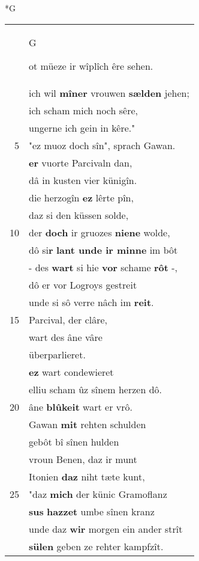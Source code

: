 \documentclass[8pt,a4paper,notitlepage]{article}
\begin{document}
\begin{table}[ht]
\begin{minipage}[t]{0.5\linewidth}
\small
\begin{center}*G
\end{center}
\begin{tabular}{rl}
 & \begin{large}G\end{large}ot müeze ir wîplîch êre sehen.\\ 
 & ich wil \textbf{mîner} vrouwen \textbf{sælden} jehen;\\ 
 & ich scham mich noch sêre,\\ 
 & ungerne ich gein in kêre."\\ 
5 & "ez muoz doch sîn", sprach Gawan.\\ 
 & \textbf{er} vuorte Parcivaln dan,\\ 
 & dâ in kusten vier künigîn.\\ 
 & die herzogîn \textbf{ez} lêrte pîn,\\ 
 & daz si den küssen solde,\\ 
10 & der \textbf{doch} ir gruozes \textbf{niene} wolde,\\ 
 & dô si\textbf{r} \textbf{lant unde ir minne} im bôt\\ 
 & - des \textbf{wart} si hie \textbf{vor} schame \textbf{rôt} -,\\ 
 & dô er vor Logroys gestreit\\ 
 & unde si sô verre nâch im \textbf{reit}.\\ 
15 & Parcival, der clâre,\\ 
 & wart des âne vâre\\ 
 & überparlieret.\\ 
 & \textbf{ez} wart condewieret\\ 
 & elliu scham ûz sînem herzen dô.\\ 
20 & âne \textbf{blûkeit} wart er vrô.\\ 
 & Gawan \textbf{mit} rehten schulden\\ 
 & gebôt bî sînen hulden\\ 
 & vroun Benen, daz ir munt\\ 
 & Itonien \textbf{daz} niht tæte kunt,\\ 
25 & "daz \textbf{mich} der künic Gramoflanz\\ 
 & \textbf{sus} \textbf{hazzet} umbe sînen kranz\\ 
 & unde daz \textbf{wir} morgen ein ander strît\\ 
 & \textbf{sülen} geben ze rehter kampfzît.\\ 

\end{tabular}
\end{minipage}
\end{table}
\end{document}
